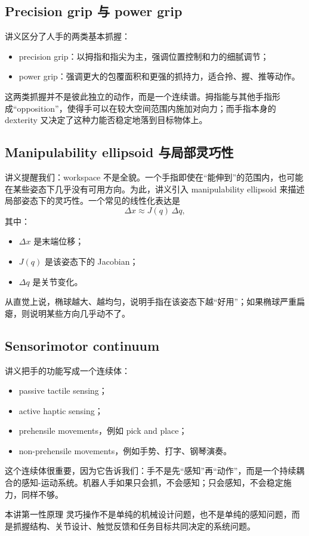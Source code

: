 \documentclass[a4paper]{article}
\begin{document}
\subsection{Precision grip 与 power grip}
讲义区分了人手的两类基本抓握：
\begin{itemize}
  \item precision grip：以拇指和指尖为主，强调位置控制和力的细腻调节；
  \item power grip：强调更大的包覆面积和更强的抓持力，适合拎、握、推等动作。
\end{itemize}
这两类抓握并不是彼此独立的动作，而是一个连续谱。拇指能与其他手指形成“opposition”，使得手可以在较大空间范围内施加对向力；而手指本身的 dexterity 又决定了这种力能否稳定地落到目标物体上。

\subsection{Manipulability ellipsoid 与局部灵巧性}
讲义提醒我们：workspace 不是全貌。一个手指即使在“能伸到”的范围内，也可能在某些姿态下几乎没有可用方向。为此，讲义引入 manipulability ellipsoid 来描述局部姿态下的灵巧性。一个常见的线性化表达是
\[
\Delta x \approx J(q)\,\Delta q,
\]
其中：
\begin{itemize}
  \item $\Delta x$ 是末端位移；
  \item $J(q)$ 是该姿态下的 Jacobian；
  \item $\Delta q$ 是关节变化。
\end{itemize}
从直觉上说，椭球越大、越均匀，说明手指在该姿态下越“好用”；如果椭球严重扁瘪，则说明某些方向几乎动不了。

\subsection{Sensorimotor continuum}
讲义把手的功能写成一个连续体：
\begin{itemize}
  \item passive tactile sensing；
  \item active haptic sensing；
  \item prehensile movements，例如 pick and place；
  \item non-prehensile movements，例如手势、打字、钢琴演奏。
\end{itemize}
这个连续体很重要，因为它告诉我们：手不是先“感知”再“动作”，而是一个持续耦合的感知-运动系统。机器人手如果只会抓，不会感知；只会感知，不会稳定施力，同样不够。

\begin{importantbox}{本讲第一性原理}
灵巧操作不是单纯的机械设计问题，也不是单纯的感知问题，而是抓握结构、关节设计、触觉反馈和任务目标共同决定的系统问题。
\end{importantbox}
\end{document}
